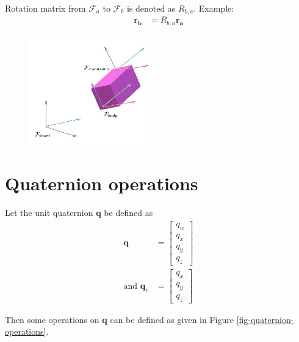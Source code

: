 \documentclass{article}
\begin{document}
Rotation matrix from $\mathcal{F}_{a}$ to $\mathcal{F}_{b}$ is denoted as $R_{b,a}$. Example:
\begin{align}
    \boldsymbol{r_{b}}&=R_{b,a}\boldsymbol{r_{a}}
\end{align}

\begin{figure}[htp]
    \centering
    \includegraphics[width=150pt]{coordinate-frames.JPG}
    \caption{}
    \label{fig-coordinate-frames}
\end{figure}

\section{Quaternion operations}
Let the unit quaternion \textbf{q} be defined as
\begin{align}
    \textbf{q} &= \left[\begin{matrix}{}q_w \\ q_x \\ q_y \\ q_z\end{matrix}\right] \\
    \text{and } \textbf{q}_v &= \left[\begin{matrix}q_x\\q_y\\q_z\end{matrix}\right]
\end{align}{}

Then some operations on \textbf{q} can be defined as given in Figure \ref{fig-quaternion-operations}.
\end{document}
